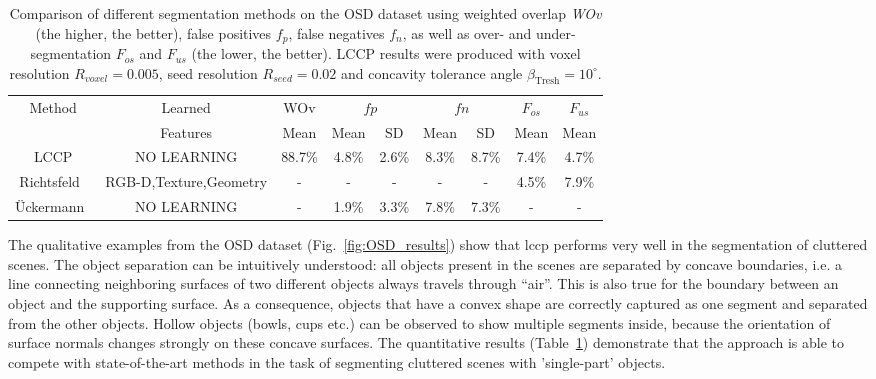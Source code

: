  \begin{table}[!ht]
   \small
   \centering
    \begin{tabular}{c||c||c||cc||cc||c||c}
    \multirow{2}{*}{Method} & Learned & WOv     & \multicolumn{2}{c||}{$fp$} & \multicolumn{2}{c||}{$fn$} & $F_{os}$ & $F_{us}$ \\ \cline{3-9}
    ~                       & Features & Mean   & Mean  & SD     & Mean  & SD    & Mean   & Mean   \\ \hline\hline
    LCCP            &  NO LEARNING & 88.7\% &  4.8\% & 2.6\%  & 8.3\% & 8.7\% & 7.4\%  & 4.7\%  \\ \hline
    Richtsfeld~\cite{Richtsfeld:IROS12}  & RGB-D,Texture,Geometry & -      & -          & -      & -     & -     & 4.5\%  & 7.9\%  \\ \hline
    {\"U}ckermann~\cite{Ritter2012} & NO LEARNING & -      & 1.9\% & 3.3\%  & 7.8\% & 7.3\% & -      & -      \\ \hline
    \end{tabular}
    \caption[Segmentation Results on OSD Dataset]{Comparison of different segmentation methods on the OSD dataset using weighted overlap \textit{WOv} (the higher, the better), false positives \textit{$f_p$}, false negatives \textit{$f_n$}, as well as over- and under-segmentation \textit{$F_{os}$} and \textit{$F_{us}$} (the lower, the better). LCCP results were produced with voxel resolution $R_{voxel} = 0.005$, seed resolution $R_{seed} = 0.02$ and concavity tolerance angle $\beta_\text{Tresh}=10^\circ$.}
    \label{tab:res_stat}
\end{table}

The qualitative examples from the OSD dataset (Fig.~\ref{fig:OSD_results}) show that \gls{lccp} performs very well in the segmentation of cluttered scenes. The object separation can be intuitively understood: all objects present in the scenes are separated by concave boundaries, i.e. a line connecting neighboring surfaces of two different objects always travels through ``air''. This is also true for the boundary between an object and the supporting surface. As a consequence, objects that have a convex shape are correctly captured as one segment and separated from the other objects. Hollow objects (bowls, cups etc.) can be observed to show multiple segments inside, because the orientation of surface normals changes strongly on these concave surfaces. The quantitative results (Table~\ref{tab:res_stat}) demonstrate that the approach is able to compete with state-of-the-art methods in the task of segmenting cluttered scenes with 'single-part' objects. 

